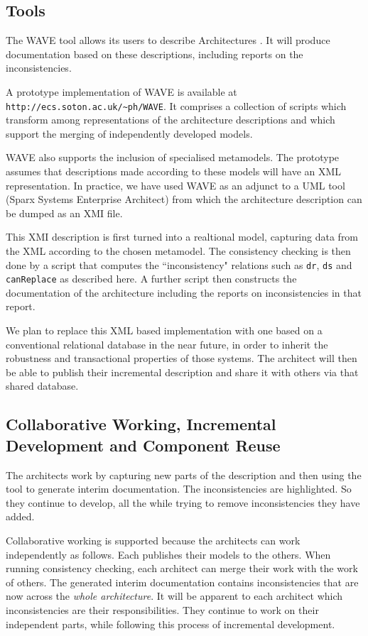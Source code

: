 \documentclass{llncs}
\begin{document}
\subsection{Tools}
\noindent The WAVE tool allows its users to describe Architectures \cite{Henderson4}. It will produce documentation based on these descriptions, including reports on the inconsistencies.

A prototype implementation of WAVE is available at {\scriptsize\verb$http://ecs.soton.ac.uk/~ph/WAVE$}. It comprises a collection of scripts which transform among representations of the architecture descriptions and which support the merging of independently developed models.

WAVE also supports the inclusion of specialised metamodels. The prototype assumes that descriptions made according to these models will have an XML representation. In practice, we have used WAVE as an adjunct to a UML tool (Sparx Systems Enterprise Architect) from which the architecture description can be dumped as an XMI file.  

This XMI description is first turned into a realtional model, capturing data from the XML according to the chosen metamodel. The consistency checking is then done by a script that computes 
the ``inconsistency" relations such as {\small\verb$dr$},  {\small\verb$ds$} and {\small\verb$canReplace$} as described here. A further script then constructs the documentation of the architecture including the reports on inconsistencies in that report.

We plan to replace this XML based implementation with one based on a conventional relational database in the near future, in order to inherit the robustness and transactional properties of those systems. The architect will then be able to publish their incremental description and share it with others via that shared database.

\subsection{Collaborative Working, Incremental Development and Component Reuse}
\noindent The architects work by capturing new parts of the description and then using the tool to generate interim documentation. The inconsistencies are highlighted. So they continue to develop, all the while trying to remove inconsistencies they have added.

Collaborative working is supported because the architects can work independently as follows. Each publishes their models to the others. When running consistency checking, each architect can merge their work with the work of others. The generated interim documentation contains inconsistencies that are now across the {\em whole architecture}. It will be apparent to each architect which inconsistencies are their responsibilities. They continue to work on their independent parts, while following this process of incremental development.
\end{document}
